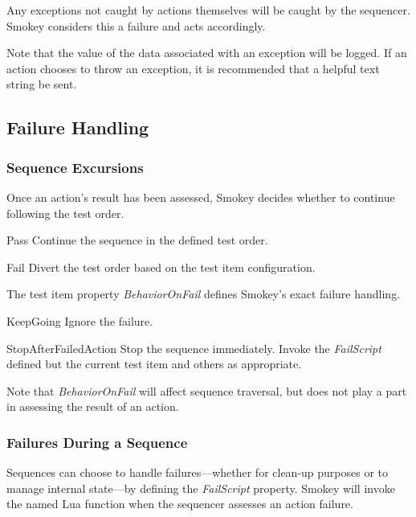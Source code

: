 \documentclass[11pt]{article}
\newcommand{\prop}[1]{{\itshape#1}}
\begin{document}
Any exceptions not caught by actions themselves will be caught by the
sequencer.  Smokey considers this a failure and acts accordingly.

Note that the value of the data associated with an exception will be logged.
If an action chooses to throw an exception, it is recommended that a helpful
text string be sent.

\subsection{Failure Handling}

\subsubsection{Sequence Excursions}

Once an action's result has been assessed, Smokey decides whether to continue
following the test order.

\begin{Definition}

\item[Pass] Continue the sequence in the defined test order.

\item[Fail] Divert the test order based on the test item configuration.

\end{Definition}

The test item property \prop{BehaviorOnFail} defines Smokey's exact failure handling.

\begin{Definition}

\item[KeepGoing] Ignore the failure.

\item[StopAfterFailedAction] Stop the sequence immediately.  Invoke the
	\prop{FailScript} defined but the current test item and others as
	appropriate.

\end{Definition}

Note that \prop{BehaviorOnFail} will affect sequence traversal, but does not play a
part in assessing the result of an action.

\subsubsection{Failures During a Sequence}

Sequences can choose to handle failures---whether for clean-up purposes or to
manage internal state---by defining the \prop{FailScript} property.  Smokey will invoke
the named Lua function when the sequencer assesses an action failure.
\end{document}
